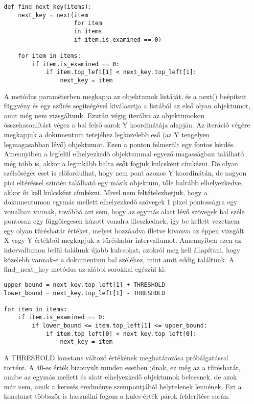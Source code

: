 \documentclass[12pt]{report}
\begin{document}
\begin{verbatim}
def find_next_key(items):
    next_key = next(item 
                    for item 
                    in items 
                    if item.is_examined == 0)

    for item in items:
        if item.is_examined == 0:
            if item.top_left[1] < next_key.top_left[1]:
                next_key = item
\end{verbatim}

A metódus paraméterben megkapja az objektumok listáját, és a next() beépített függvény és egy szűrés segítségével kiválasztja a listából az első olyan objektumot, amit még nem vizsgáltunk. Ezután végig iterálva az objektumokon összehasonlítást végez a bal felső sarok Y koordinátája alapján. Az iteráció végére megkapjuk a dokumentum tetejéhez legközelebb eső (az Y tengelyen legmagasabban lévő) objektumot.
Ezen a ponton felmerült egy fontos kérdés. Amennyiben a legfelül elhelyezkedő objektummal egyező magasságban található még több is, akkor a leginkább balra esőt fogjuk kulcsként címkézni. De olyan szélsőséges eset is előfordulhat, hogy nem pont azonos Y koordinátán, de nagyon pici eltéréssel szintén található egy másik objektum, tőle balrább elhelyezkedve, akkor őt kell kulcsként címkézni.
Mivel nem feltételezhetjük, hogy a dokumentumon egymás mellett elhelyezkedő szövegek 1 pixel pontosságra egy vonalban vannak, továbbá azt sem, hogy az egymás alatt lévő szövegek bal széle pontosan egy függőlegesen húzott vonalra illeszkednek, így be kellett vezetnem egy olyan tűréshatár értéket, melyet hozzáadva illetve kivonva az éppen vizsgált X vagy Y értékből megkapjuk a tűréshatár intervallumot.
Amennyiben ezen az intervallumon belül találunk újabb kulcsokat, azokról meg kell állapítani, hogy közelebb vannak-e a dokumentum bal széléhez, mint amit eddig találtunk. A find\_next\_key metódus az alábbi sorokkal egészül ki:

\begin{verbatim}
upper_bound = next_key.top_left[1] + THRESHOLD
lower_bound = next_key.top_left[1] - THRESHOLD

for item in items:
    if item.is_examined == 0:
        if lower_bound <= item.top_left[1] <= upper_bound:
            if item.top_left[0] < next_key.top_left[0]:
                next_key = item
\end{verbatim}

\newpage

A THRESHOLD konstans változó értékének meghatározása próbálgatással történt. A 40-es érték bizonyult minden esetben jónak, ez még az a tűréshatár, amibe az egymás mellett és alatt elhelyezkedő objektumok beleesnek, de azok már nem, amik a keresés eredménye szempontjából helytelenek lennének. Ezt a konstanst többször is használni fogom a kulcs-érték párok felderítése során.
\end{document}
